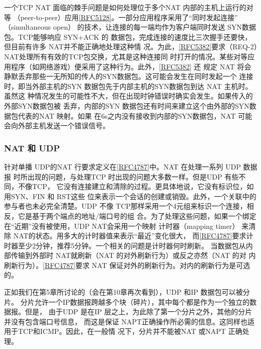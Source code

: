 一个TCP NAT 面临的棘手问题是如何处理位于多个NAT 内部的主机上运行的对等
（peer-to-peer）应用\href{https://www.rfc-editor.org/rfc/rfc5128}{[RFC5128]}。一部分应用程序采用了“同时发起连接” （simultaneous open）
的技术，让连接的每一端均作为客户端同时发送 SYN数据包。TCP能够响应 SYN+ACK 的
数据包，完成连接的速度比三次握手还要快，但目前有许多 NAT并不能正确地处理这种情
况。为此，\href{https://www.rfc-editor.org/rfc/rfc5382}{[RFC5382]}要求（REQ-2）NAT处理所有有效的TCP包交换，尤其是这种连接同
时打开的情况。某些对等应用程序（如网络游戏）便采用了这种行为。此外，\href{https://www.rfc-editor.org/rfc/rfc5382}{[RFC5382]} 还
规定 NAT 将会静默丢弃那些一无所知的传人的SYN数据包。这可能会发生在同时发起一个
连接时，即当外部主机的SYN 数据包先于内部主机的SYN数据包到达 NAT 主机时。虽然这
种情况发生的可能性不大，但在出现时钟错误时确实会发生。如果传入的外部SYN数据包被
丢弃，内部的SYN 数据包还有时间来建立这个由外部的SYN数据包代表的NAT 映射。如果
在6s之内没有接收到内部的SYN数据包，NAT 可能会向外部主机发送一个错误信号。

\subsubsection{NAT 和 UDP}

针对单播 UDP的NAT 行要求定义在\href{https://www.rfc-editor.org/rfc/rfc4787}{[RFC4787]}中。NAT 在处理一系列 UDP 数据报
时所出现的问题，与处理TCP 时出现的问题大多数一样。但是UDP 有些不同，不像TCP，
它没有连接建立和清除的过程。更具体地说，它没有标识位，如用SYN、FIN 和 RST这些
位来表示一个会话的创建或销毁。此外，一个关联中的参与者也未必完全清楚。UDP 不像
TCP那样采用一个4元组来标识一个连接，相反，它是基于两个端点的地址/端口号的组
合。为了处理这些问题，如果一个绑定在“近期”没有被使用，UDP NAT会采用一个映射
计时器（mapping timer） 来清除 NAT的状态。用多大的计时器值来表示“最近”变化很大，
而\href{https://www.rfc-editor.org/rfc/rfc4787}{[RFC4787]}要求计时器至少2分钟，推荐5分钟。一个相关的问题是计时器何时刷新。
当数据包从内部传输到外部时 NAT就刷新（NAT 的对外刷新行为）或反之亦然（NAT 的对
内刷新行为）。\href{https://www.rfc-editor.org/rfc/rfc4787}{[RFC4787]}要求 NAT 保证对外的刷新行为。对内的刷新行为是可选的。

正如我们在第5章所讨论的（会在第10章再次看到），UDP 和IP 数据包可以被分片。
分片允许一个IP数据报跨越多个块（碎片），其中每个都是作为一个独立的数据报。但是，
由于UDP 是在IP 层之上，为此除了第一个分片之外，其他的分片并没有包含端口号信息，
而这是保证 NAPT正确操作所必需的信息。这同样也适用于TCP和ICMP。因此，在一般情
况下，分片并不能被NAT 或NAPT 正确处理。

